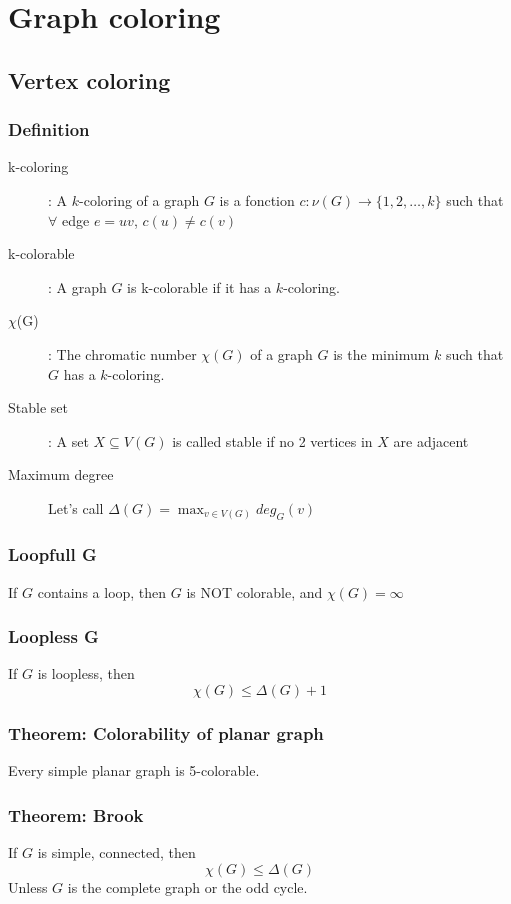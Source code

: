 \chapter{Graph coloring}
    \section{Vertex coloring}
        \subsection{Definition}
            \begin{description}
                \item[k-coloring]: A $k$-coloring of a graph $G$ is a fonction $c:\nu(G)\rightarrow\{1, 2, \ldots, k\}$ such that $\forall$ edge $e=uv$, $c(u)\neq c(v)$
                \item[k-colorable]: A graph $G$ is k-colorable if it has a $k$-coloring.
                \item[$\chi$(G)]: The chromatic number $\chi(G)$ of a graph $G$ is the minimum $k$ such that $G$ has a $k$-coloring.
                \item[Stable set]: A set $X\subseteq V(G)$ is called stable if no 2 vertices in $X$ are adjacent
                \item[Maximum degree] Let's call $\Delta(G)=\max_{v\in V(G)}{deg_G(v)}$
            \end{description}
        \subsection{Loopfull G}
            If $G$ contains a loop, then $G$ is NOT colorable, and $\chi(G)=\infty$
        \subsection{Loopless G}
            If $G$ is loopless, then 
                \[\chi(G)\leq \Delta(G)+1\]
        \subsection{Theorem: Colorability of planar graph}
            Every simple planar graph is 5-colorable.
        \subsection{Theorem: Brook}
            If $G$ is simple, connected, then
                \[\chi(G)\leq\Delta(G)\]
            Unless $G$ is the complete graph or the odd cycle.
